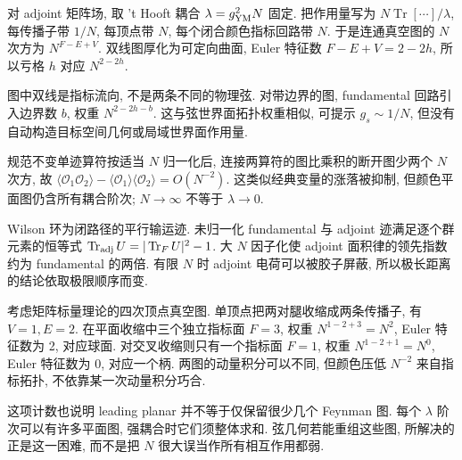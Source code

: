 \label{ch:largeN}
对 adjoint 矩阵场, 取 't Hooft 耦合 $\lambda=g_{\rm YM}^2N$ 固定. 把作用量写为 $N\operatorname{Tr}[\cdots]/\lambda$, 每传播子带 $1/N$, 每顶点带 $N$, 每个闭合颜色指标回路带 $N$. 于是连通真空图的 $N$ 次方为 $N^{F-E+V}$. 双线图厚化为可定向曲面, Euler 特征数 $F-E+V=2-2h$, 所以亏格 $h$ 对应 $N^{2-2h}$.

\begin{center}\end{center}
图中双线是指标流向, 不是两条不同的物理弦. 对带边界的图, fundamental 回路引入边界数 $b$, 权重 $N^{2-2h-b}$. 这与弦世界面拓扑权重相似, 可提示 $g_s\sim1/N$, 但没有自动构造目标空间几何或局域世界面作用量.

规范不变单迹算符按适当 $N$ 归一化后, 连接两算符的图比乘积的断开图少两个 $N$ 次方, 故 $\langle\mathcal O_1\mathcal O_2\rangle-\langle\mathcal O_1\rangle\langle\mathcal O_2\rangle=O(N^{-2})$. 这类似经典变量的涨落被抑制, 但颜色平面图仍含所有耦合阶次; $N\to\infty$ 不等于 $\lambda\to0$.

Wilson 环为闭路径的平行输运迹. 未归一化 fundamental 与 adjoint 迹满足逐个群元素的恒等式 $\operatorname{Tr}_{\rm adj}U=|\operatorname{Tr}_{F}U|^2-1$. 大 $N$ 因子化使 adjoint 面积律的领先指数约为 fundamental 的两倍. 有限 $N$ 时 adjoint 电荷可以被胶子屏蔽, 所以极长距离的结论依取极限顺序而变.

考虑矩阵标量理论的四次顶点真空图. 单顶点把两对腿收缩成两条传播子, 有 $V=1,E=2$. 在平面收缩中三个独立指标面 $F=3$, 权重 $N^{1-2+3}=N^2$, Euler 特征数为 2, 对应球面. 对交叉收缩则只有一个指标面 $F=1$, 权重 $N^{1-2+1}=N^0$, Euler 特征数为 0, 对应一个柄. 两图的动量积分可以不同, 但颜色压低 $N^{-2}$ 来自指标拓扑, 不依靠某一次动量积分巧合.

这项计数也说明 leading planar 并不等于仅保留很少几个 Feynman 图. 每个 $\lambda$ 阶次可以有许多平面图, 强耦合时它们须整体求和. 弦几何若能重组这些图, 所解决的正是这一困难, 而不是把 $N$ 很大误当作所有相互作用都弱.
